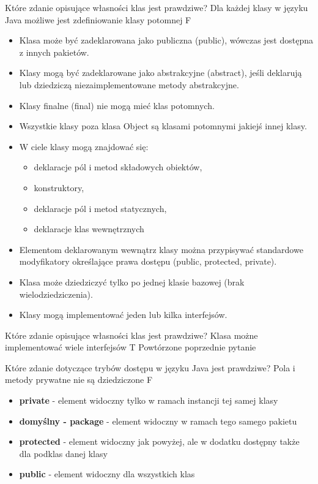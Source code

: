 \answer
{Które zdanie opisujące własności klas jest prawdziwe?}
{Dla każdej klasy w języku Java możliwe jest zdefiniowanie klasy potomnej}
{F}
{\begin{itemize}
	\item Klasa może być zadeklarowana jako publiczna (public), wówczas jest dostępna z innych pakietów.
 	\item Klasy mogą być zadeklarowane jako abstrakcyjne (abstract), jeśli deklarują lub dziedziczą niezaimplementowane metody abstrakcyjne.
 	\item Klasy finalne (final) nie mogą mieć klas potomnych.
  	\item Wszystkie klasy poza klasa Object są klasami potomnymi jakiejś innej klasy. 
  	\item W ciele klasy mogą znajdować się:
    \begin{itemize}
 	 	\item deklaracje pól i metod składowych obiektów,
 	 	\item konstruktory,
 	 	\item deklaracje pól i metod statycznych,
 	 	\item deklaracje klas wewnętrznych
 	\end{itemize}
  	\item Elementom deklarowanym wewnątrz klasy można przypisywać standardowe modyfikatory określające prawa dostępu (public, protected, private).
  	\item Klasa może dziedziczyć tylko po jednej klasie bazowej (brak wielodziedziczenia).
  	\item Klasy mogą implementować jeden lub kilka interfejsów.
\end{itemize}}
{}

\answer
{Które zdanie opisujące własności klas jest prawdziwe?}
{Klasa możne implementować wiele interfejsów}
{T}
{Powtórzone poprzednie pytanie}
{}

\answer
{Które zdanie dotyczące trybów dostępu w języku Java jest prawdziwe?}
{Pola i metody prywatne nie są dziedziczone}
{F}
{
\begin{itemize}
\item[] \textbf{private} - element widoczny tylko w ramach instancji tej samej klasy
\item[] \textbf{domyślny - package} - element widoczny w ramach tego samego pakietu
\item[] \textbf{protected} - element widoczny jak powyżej, ale w dodatku dostępny także dla podklas danej klasy
\item[] \textbf{public} - element widoczny dla wszystkich klas
\end{itemize}
}
{}


